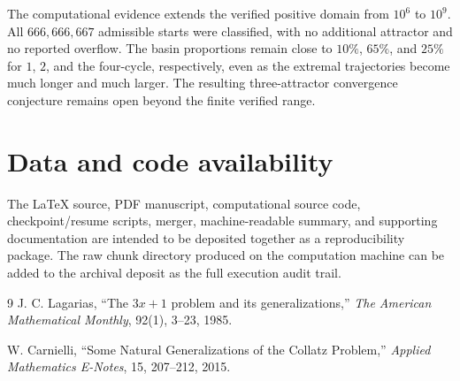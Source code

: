 \documentclass[11pt]{article}
\begin{document}
The computational evidence extends the verified positive domain from $10^6$ to $10^9$.  All $666,666,667$ admissible starts were classified, with no additional attractor and no reported overflow.  The basin proportions remain close to $10\%$, $65\%$, and $25\%$ for $1$, $2$, and the four-cycle, respectively, even as the extremal trajectories become much longer and much larger.  The resulting three-attractor convergence conjecture remains open beyond the finite verified range.

\section*{Data and code availability}
The LaTeX source, PDF manuscript, computational source code, checkpoint/resume scripts, merger, machine-readable summary, and supporting documentation are intended to be deposited together as a reproducibility package.  The raw chunk directory produced on the computation machine can be added to the archival deposit as the full execution audit trail.

\begin{thebibliography}{9}
J. C. Lagarias,
``The $3x+1$ problem and its generalizations,''
\emph{The American Mathematical Monthly}, 92(1), 3--23, 1985.

W. Carnielli,
``Some Natural Generalizations of the Collatz Problem,''
\emph{Applied Mathematics E-Notes}, 15, 207--212, 2015.

\end{thebibliography}
\end{document}
